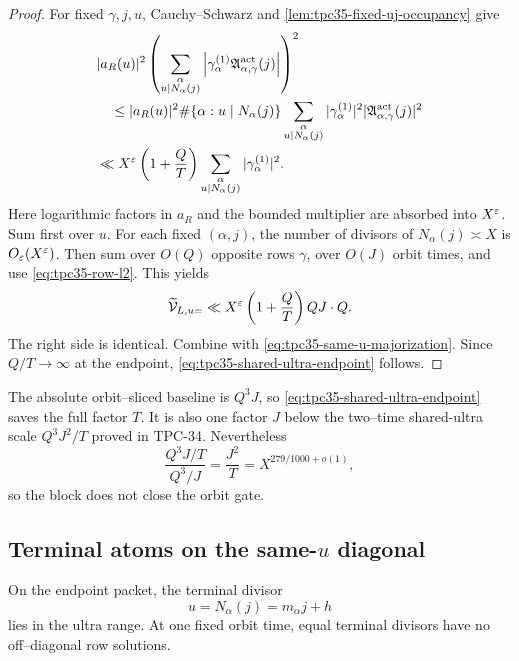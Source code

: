 \begin{proof}
For fixed \(\gamma,j,u\), Cauchy--Schwarz and
\cref{lem:tpc35-fixed-uj-occupancy} give
\begin{align*}
 &|a_R(u)|^2
 \left(
 \sum_{\substack{\alpha\\u\mid N_\alpha(j)}}
 \left|\gamma_\alpha^{(1)}
 \mathfrak A_{\alpha,\gamma}^{\rm act}(j)\right|
 \right)^2\\
 &\quad\le |a_R(u)|^2
 \#\{\alpha:u\mid N_\alpha(j)\}
 \sum_{\substack{\alpha\\u\mid N_\alpha(j)}}
 |\gamma_\alpha^{(1)}|^2
 |\mathfrak A_{\alpha,\gamma}^{\rm act}(j)|^2\\
 &\ll X^\varepsilon\left(1+\frac QT\right)
 \sum_{\substack{\alpha\\u\mid N_\alpha(j)}}
 |\gamma_\alpha^{(1)}|^2.
\end{align*}
Here logarithmic factors in \(a_R\) and the bounded multiplier are
absorbed into \(X^\varepsilon\).  Sum first over \(u\).  For each fixed
\((\alpha,j)\), the number of divisors of \(N_\alpha(j)\asymp X\) is
\(O_\varepsilon(X^\varepsilon)\).  Then sum over \(O(Q)\) opposite rows \(\gamma\), over
\(O(J)\) orbit times, and use \eqref{eq:tpc35-row-l2}.  This yields
\[
 \widetilde{\mathcal V}_{L,u=}
 \ll X^\varepsilon\left(1+\frac QT\right)QJ\cdot Q.
\]
The right side is identical.  Combine with
\eqref{eq:tpc35-same-u-majorization}.  Since \(Q/T\to\infty\) at the
endpoint, \eqref{eq:tpc35-shared-ultra-endpoint} follows.
\end{proof}

The absolute orbit--sliced baseline is \(Q^3J\), so
\eqref{eq:tpc35-shared-ultra-endpoint} saves the full factor \(T\).  It is
also one factor \(J\) below the two--time shared-ultra scale
\(Q^3J^2/T\) proved in TPC-34.  Nevertheless
\begin{equation}
 \frac{Q^3J/T}{Q^3/J}=\frac{J^2}{T}
 =X^{279/1000+o(1)},
 \label{eq:tpc35-shared-ultra-gap}
\end{equation}
so the block does not close the orbit gate.

\subsection{Terminal atoms on the same-\texorpdfstring{\(u\)}{u} diagonal}

On the endpoint packet, the terminal divisor
\begin{equation}
 u=N_\alpha(j)=m_\alpha j+h
 \label{eq:tpc35-terminal-divisor}
\end{equation}
lies in the ultra range.  At one fixed orbit time, equal terminal divisors
have no off--diagonal row solutions.

